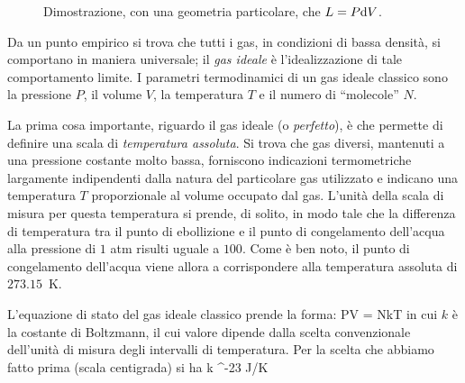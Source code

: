 \begin{figure}[!ht]
\centering
{}
\label{fig:pistone}
\caption{Dimostrazione, con una geometria particolare, che $L=P{\textrm d}V$.}
\end{figure}

Da un punto empirico si trova che tutti i gas, in condizioni di bassa densità, si comportano in maniera universale; il {\em gas ideale} è l'idealizzazione di tale comportamento limite. I parametri termodinamici di un gas  ideale classico sono la pressione $P$, il volume $V$, la temperatura $T$ e il numero di ``molecole'' $N$.

La prima cosa importante, riguardo il gas ideale (o {\em perfetto}), è che permette di definire una scala di {\em temperatura assoluta}. Si trova che gas diversi, mantenuti a una pressione costante molto bassa, forniscono indicazioni termometriche largamente indipendenti dalla natura del particolare gas utilizzato e indicano una temperatura $T$ proporzionale al volume occupato dal gas. L'unità della scala di misura per questa temperatura si prende, di solito, in modo tale che la differenza di temperatura tra il punto di ebollizione e il punto di congelamento dell'acqua alla pressione di $1$ atm risulti uguale a $100$. Come è ben noto, il punto di congelamento dell'acqua viene allora a corrispondere alla temperatura assoluta di $273.15$~K.

L'equazione di stato del gas ideale classico prende la forma:
\be
\label{eq:pvnkt}
PV = NkT
\ee
in cui $k$ è la costante di Boltzmann, il cui valore dipende dalla scelta convenzionale dell'unità di misura degli intervalli di temperatura. Per la scelta che abbiamo fatto prima (scala centigrada) si ha
\be
\label{eq:valk}
k  ^{-23} \textrm{J/K}
\ee

